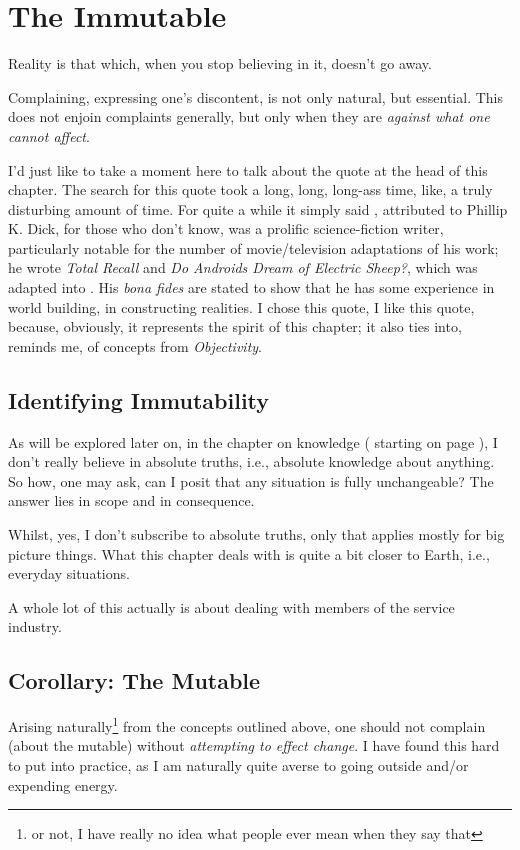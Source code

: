 \documentclass[../butidigress.tex]{subfiles}
\begin{document}
\chapter{The Immutable}\label{chap:immutable}
\epigraph{Reality is that which, when you stop believing in it, doesn't go away.}{}
\newpage
{}
Complaining, expressing one's discontent, is not only natural, but essential.
This does not enjoin complaints generally, but only when they are \emph{against what one cannot affect}.

I'd just like to take a moment here to talk about the quote at the head of this chapter.
The search for this quote took a long, long, long-ass time, like, a truly disturbing amount of time.
For quite a while it simply said , attributed to 
Phillip K. Dick, for those who don't know, was a prolific science-fiction writer, particularly notable for the number of movie/television adaptations of his work; he wrote \textit{Total Recall} and \textit{Do Androids Dream of Electric Sheep?}, which was adapted into .
His \textit{bona fides} are stated to show that he has some experience in world building, in constructing realities.
I chose this quote, I like this quote, because, obviously, it represents the spirit of this chapter; it also ties into, reminds me, of concepts from \textit{Objectivity}.

\section{Identifying Immutability}
As will be explored later on, in the chapter on knowledge ( starting on page \pageref{chap:knowledge}), I don't really believe in absolute truths, i.e., absolute knowledge about anything.
So how, one may ask, can I posit that any situation is fully unchangeable?
The answer lies in scope and in consequence.

Whilst, yes, I don't subscribe to absolute truths, only  that applies mostly for big picture things.
What this chapter deals with is quite a bit closer to Earth, i.e., everyday situations.

A whole lot of this actually is about dealing with members of the service industry.

\section{Corollary: The Mutable}
Arising naturally\footnote{or not, I have really no idea what people ever mean when they say that} from the concepts outlined above, one should not complain (about the mutable) without \emph{attempting to effect change}.
I have found this hard to put into practice, as I am naturally quite averse to going outside and/or expending energy.
\end{document}
